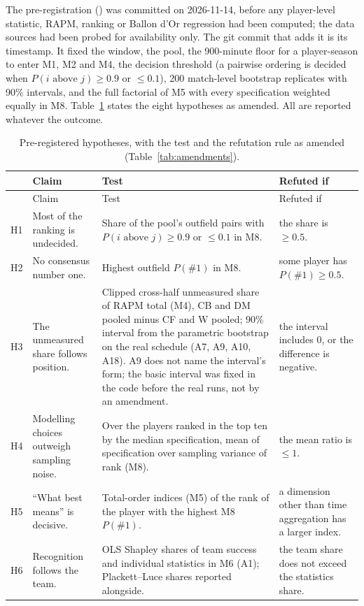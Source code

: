 \documentclass[11pt,a4paper]{article}
\begin{document}
The pre-registration () was
committed on 2026-11-14, before any player-level statistic, RAPM, ranking or
Ballon d'Or regression had been computed; the data sources had been probed for
availability only. The git commit that adds it is its timestamp. It fixed the
window, the pool, the 900-minute floor for a player-season to enter M1, M2 and
M4, the decision threshold (a pairwise ordering is decided when
$P(i \text{ above } j) \ge 0.9$ or $\le 0.1$), 200 match-level bootstrap
replicates with 90\% intervals, and the full factorial of M5 with every
specification weighted equally in M8. Table~\ref{tab:hypotheses} states the
eight hypotheses as amended. All are reported whatever the outcome.

{\small
\setlength{\tabcolsep}{4pt}
\begin{longtable}{@{}L{0.6cm}L{3.1cm}L{7.4cm}L{3.5cm}@{}}
\caption{Pre-registered hypotheses, with the test and the refutation rule as
amended (Table~\ref{tab:amendments}).}
\label{tab:hypotheses}\\
\toprule
& Claim & Test & Refuted if \\
\midrule
\endfirsthead
\toprule
& Claim & Test & Refuted if \\
\midrule
\endhead
\bottomrule
\endlastfoot
H1 & Most of the ranking is undecided. & Share of the pool's outfield pairs with $P(i\text{ above }j) \ge 0.9$ or $\le 0.1$ in M8. & the share is $\ge 0.5$. \\
H2 & No consensus number one. & Highest outfield $P(\#1)$ in M8. & some player has $P(\#1) \ge 0.5$. \\
H3 & The unmeasured share follows position. & Clipped cross-half unmeasured share of RAPM total (M4), CB and DM pooled minus CF and W pooled; 90\% interval from the parametric bootstrap on the real schedule (A7, A9, A10, A18). A9 does not name the interval's form; the basic interval was fixed in the code before the real runs, not by an amendment. & the interval includes 0, or the difference is negative. \\
H4 & Modelling choices outweigh sampling noise. & Over the players ranked in the top ten by the median specification, mean of specification over sampling variance of rank (M8). & the mean ratio is $\le 1$. \\
H5 & ``What best means'' is decisive. & Total-order indices (M5) of the rank of the player with the highest M8 $P(\#1)$. & a dimension other than time aggregation has a larger index. \\
H6 & Recognition follows the team. & OLS Shapley shares of team success and individual statistics in M6 (A1); Plackett--Luce shares reported alongside. & the team share does not exceed the statistics share. \\

\end{longtable}}
\end{document}
